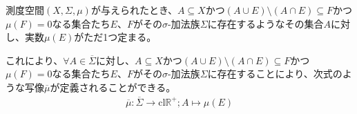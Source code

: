 \documentclass[dvipdfmx]{jsarticle}
\begin{document}
\begin{thm}\label{4.5.3.19}
測度空間$(X,\varSigma,\mu)$が与えられたとき、$A \subseteq X$かつ$(A \cup E) \setminus (A \cap E) \subseteq F$かつ$\mu(F) = 0$なる集合たち$E$、$F$がその$\sigma$-加法族$\varSigma$に存在するようなその集合$A$に対し、実数$\mu(E)$がただ1つ定まる。
\end{thm}
\begin{dfn}
これにより、$\forall A \in \overline{\varSigma}$に対し、$A \subseteq X$かつ$(A \cup E) \setminus (A \cap E) \subseteq F$かつ$\mu(F) = 0$なる集合たち$E$、$F$がその$\sigma$-加法族$\varSigma$に存在することにより、次式のような写像$\overline{\mu}$が定義されることができる。
\begin{align*}
\overline{\mu}:\overline{\varSigma} \rightarrow \mathrm{cl}\mathbb{R}^{+};A \mapsto \mu(E)
\end{align*}
\end{dfn}
\end{document}
